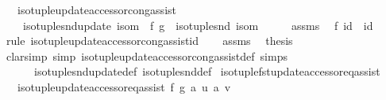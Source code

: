 \begin{isabellebody}
\ \ \ {\isachardoublequoteopen}iso{\isacharunderscore}{\kern0pt}tuple{\isacharunderscore}{\kern0pt}update{\isacharunderscore}{\kern0pt}accessor{\isacharunderscore}{\kern0pt}cong{\isacharunderscore}{\kern0pt}assist\isanewline
\ \ \ \ {\isacharparenleft}{\kern0pt}iso{\isacharunderscore}{\kern0pt}tuple{\isacharunderscore}{\kern0pt}snd{\isacharunderscore}{\kern0pt}update\ isom\ {\isasymcirc}\ f{\isacharparenright}{\kern0pt}\ {\isacharparenleft}{\kern0pt}g\ {\isasymcirc}\ iso{\isacharunderscore}{\kern0pt}tuple{\isacharunderscore}{\kern0pt}snd\ isom{\isacharparenright}{\kern0pt}{\isachardoublequoteclose}\isanewline
%
\isadelimproof
%
\endisadelimproof
%
\isatagproof
{}\isamarkupfalse%
\ {\isacharminus}{\kern0pt}\isanewline
\ \ \isamarkupfalse%
\ assms\ \isamarkupfalse%
\ {\isachardoublequoteopen}f\ id\ {\isacharequal}{\kern0pt}\ id{\isachardoublequoteclose}\isanewline
\ \ \ \ \isamarkupfalse%
\ {\isacharparenleft}{\kern0pt}rule\ iso{\isacharunderscore}{\kern0pt}tuple{\isacharunderscore}{\kern0pt}update{\isacharunderscore}{\kern0pt}accessor{\isacharunderscore}{\kern0pt}cong{\isacharunderscore}{\kern0pt}assist{\isacharunderscore}{\kern0pt}id{\isacharparenright}{\kern0pt}\isanewline
\ \ \isamarkupfalse%
\ assms\ \isamarkupfalse%
\ {\isacharquery}{\kern0pt}thesis\isanewline
\ \ \ \ \isamarkupfalse%
\ {\isacharparenleft}{\kern0pt}clarsimp\ simp{\isacharcolon}{\kern0pt}\ iso{\isacharunderscore}{\kern0pt}tuple{\isacharunderscore}{\kern0pt}update{\isacharunderscore}{\kern0pt}accessor{\isacharunderscore}{\kern0pt}cong{\isacharunderscore}{\kern0pt}assist{\isacharunderscore}{\kern0pt}def\ simps\isanewline
\ \ \ \ \ \ iso{\isacharunderscore}{\kern0pt}tuple{\isacharunderscore}{\kern0pt}snd{\isacharunderscore}{\kern0pt}update{\isacharunderscore}{\kern0pt}def\ iso{\isacharunderscore}{\kern0pt}tuple{\isacharunderscore}{\kern0pt}snd{\isacharunderscore}{\kern0pt}def{\isacharparenright}{\kern0pt}\isanewline
{}\isamarkupfalse%
%
\endisatagproof
{\isafoldproof}%
%
\isadelimproof
\isanewline
%
\endisadelimproof
\isanewline
{}\isamarkupfalse%
\ iso{\isacharunderscore}{\kern0pt}tuple{\isacharunderscore}{\kern0pt}fst{\isacharunderscore}{\kern0pt}update{\isacharunderscore}{\kern0pt}accessor{\isacharunderscore}{\kern0pt}eq{\isacharunderscore}{\kern0pt}assist{\isacharcolon}{\kern0pt}\isanewline
\ \ \ {\isachardoublequoteopen}iso{\isacharunderscore}{\kern0pt}tuple{\isacharunderscore}{\kern0pt}update{\isacharunderscore}{\kern0pt}accessor{\isacharunderscore}{\kern0pt}eq{\isacharunderscore}{\kern0pt}assist\ f\ g\ a\ u\ a{\isacharprime}{\kern0pt}\ v{\isachardoublequoteclose}\isanewline

\end{isabellebody}
